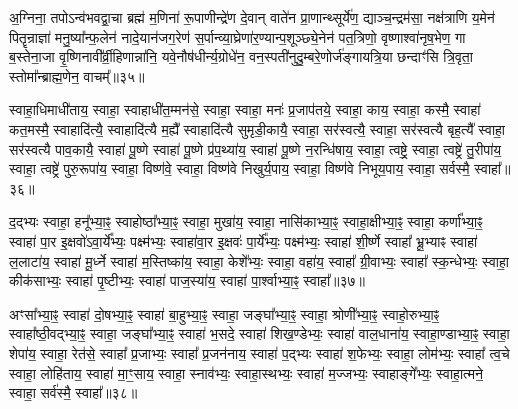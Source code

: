 {\anuvakamend[{अ॒ग्नि॒ष्टो॒मो वि॑शत्व॒ष्टाद॑श च॥13॥}]}

अ॒ग्निना॒ तपो\-ऽन्व॑भवद्वा॒चा ब्रह्म॑ म॒णिना॑ रू॒पाणीन्द्रे॑ण दे॒वान् वाते॑न प्रा॒णान्थ्सूर्ये॑ण॒ द्याञ्च॒न्द्रम॑सा॒ नक्ष॑त्राणि य॒मेन॑ पितॄन्राज्ञा॑ मनु॒ष्या᳚न्फ॒लेन॑ नादे॒यान॑जग॒रेण॑ स॒र्पान्व्या॒घ्रेणा॑र॒ण्यान्प॒शूञ्छ्ये॒नेन॑ पत॒त्रिणो॒ वृष्णाश्वा॑नृष॒भेण॒ गा ब॒स्तेना॒जा वृ॒ष्णिनावी᳚र्व्री॒हिणान्ना॑नि॒ यवे॒नौष॑धीर्न्य॒ग्रोधे॑न॒ वन॒स्पती॑नुदु॒म्बरे॒णोर्ज॑ङ्गायत्रि॒या छन्दाꣳ॑सि त्रि॒वृता॒ स्तोमा᳚न्ब्राह्म॒णेन॒ वाचम्᳚॥३५॥

{\anuvakamend[{ब्रा॒ह्म॒णेनैक॑ञ्च॥14॥}]}

स्वाहा॒धिमाधी॑ताय॒ स्वाहा॒ स्वाहाधी॑त॒म्मन॑से॒ स्वाहा॒ स्वाहा॒ मनः॑ प्र॒जाप॑तये॒ स्वाहा॒ काय॒ स्वाहा॒ कस्मै॒ स्वाहा॑ कत॒मस्मै॒ स्वाहादि॑त्यै॒ स्वाहादि॑त्यै म॒ह्यै᳚ स्वाहादि॑त्यै सुमृडी॒कायै॒ स्वाहा॒ सर॑स्वत्यै॒ स्वाहा॒ सर॑स्वत्यै बृह॒त्यै᳚ स्वाहा॒ सर॑स्वत्यै पाव॒कायै॒ स्वाहा॑ पू॒ष्णे स्वाहा॑ पू॒ष्णे प्र॑प॒थ्या॑य॒ स्वाहा॑ पू॒ष्णे न॒रन्धि॑षाय॒ स्वाहा॒ त्वष्ट्रे॒ स्वाहा॒ त्वष्ट्रे॑ तु॒रीपा॑य॒ स्वाहा॒ त्वष्ट्रे॑ पुरु॒रूपा॑य॒ स्वाहा॒ विष्ण॑वे॒ स्वाहा॒ विष्ण॑वे निखुर्य॒पाय॒ स्वाहा॒ विष्ण॑वे निभूय॒पाय॒ स्वाहा॒ सर्वस्मै॒ स्वाहा᳚॥३६॥

{\anuvakamend[{पु॒रु॒रूपा॑य॒ स्वाहा॒ दश॑ च॥15॥}]}

द॒द्भ्यः स्वाहा॒ हनू᳚भ्या॒ꣴ॒ स्वाहोष्ठा᳚भ्या॒ꣴ॒ स्वाहा॒ मुखा॑य॒ स्वाहा॒ नासि॑काभ्या॒ꣴ॒ स्वाहा॒क्षीभ्या॒ꣴ॒ स्वाहा॒ कर्णा᳚भ्या॒ꣴ॒ स्वाहा॑ पा॒र इ॒क्षवो॑\-ऽवा॒र्ये᳚भ्यः॒ पक्ष्म॑भ्यः॒ स्वाहा॑वा॒र इ॒क्षवः॑ पा॒र्ये᳚भ्यः॒ पक्ष्म॑भ्यः॒ स्वाहा॑ शी॒र्\mbox{}ष्णे स्वाहा᳚ भ्रू॒भ्याꣴ स्वाहा॑ ल॒लाटा॑य॒ स्वाहा॑ मू॒र्ध्ने स्वाहा॑ म॒स्तिष्का॑य॒ स्वाहा॒ केशे᳚भ्यः॒ स्वाहा॒ वहा॑य॒ स्वाहा᳚ ग्री॒वाभ्यः॒ स्वाहा᳚ स्क॒न्धेभ्यः॒ स्वाहा॒ कीक॑साभ्यः॒ स्वाहा॑ पृ॒ष्टीभ्यः॒ स्वाहा॑ पाज॒स्या॑य॒ स्वाहा॑ पा॒र्श्वाभ्या॒ꣴ॒ स्वाहा᳚॥३७॥

अꣳसा᳚भ्या॒ꣴ॒ स्वाहा॑ दो॒षभ्या॒ꣴ॒ स्वाहा॑ बा॒हुभ्या॒ꣴ॒ स्वाहा॒ जङ्घा᳚भ्या॒ꣴ॒ स्वाहा॒ श्रोणी᳚भ्या॒ꣴ॒ स्वाहो॒रुभ्या॒ꣴ॒ स्वाहा᳚ष्ठी॒वद्भ्या॒ꣴ॒ स्वाहा॒ जङ्घा᳚भ्या॒ꣴ॒ स्वाहा॑ भ॒सदे॒ स्वाहा॑ शिख॒ण्डेभ्यः॒ स्वाहा॑ वाल॒धाना॑य॒ स्वाहा॒ण्डाभ्या॒ꣴ॒ स्वाहा॒ शेपा॑य॒ स्वाहा॒ रेत॑से॒ स्वाहा᳚ प्र॒जाभ्यः॒ स्वाहा᳚ प्र॒जन॑नाय॒ स्वाहा॑ प॒द्भ्यः स्वाहा॑ श॒फेभ्यः॒ स्वाहा॒ लोम॑भ्यः॒ स्वाहा᳚ त्व॒चे स्वाहा॒ लोहि॑ताय॒ स्वाहा॑ मा॒ꣳ॒साय॒ स्वाहा॒ स्नाव॑भ्यः॒ स्वाहा॒स्थभ्यः॒ स्वाहा॑ म॒ज्जभ्यः॒ स्वाहाङ्गे᳚भ्यः॒ स्वाहा॒त्मने॒ स्वाहा॒ सर्व॑स्मै॒ स्वाहा᳚॥३८॥

{\anuvakamend[{पा॒र्श्वाभ्या॒ꣴ॒ स्वाहा॑ म॒ज्जभ्यः॒ स्वाहा॒ षट्च॑॥16॥}]}

